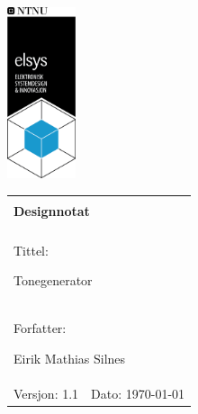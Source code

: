 \begin{minipage}[c]{0.15\textwidth}
\includegraphics[width=2.0cm]{Bilder/elsys_pos_staaende_ntnu.png}  
\end{minipage}
\begin{minipage}[c]{0.85\textwidth}

\renewcommand{\arraystretch}{1.7}
\large 
\begin{tabularx}{\textwidth}{|X|X|}
\hline
\multicolumn{2}{|l|}{} \\
\multicolumn{2}{|l|}{\huge \textbf{Designnotat}} \\
\multicolumn{2}{|l|}{}  \\
\hline
\multicolumn{2}{|l|}{Tittel: 

Tonegenerator
} \\ 
\hline
\multicolumn{2}{|l|}{Forfatter: 

Eirik Mathias Silnes
} \\
\hline

Versjon: 1.1 & Dato: \today
\\
\hline 
\end{tabularx}
\end{minipage}
\normalsize